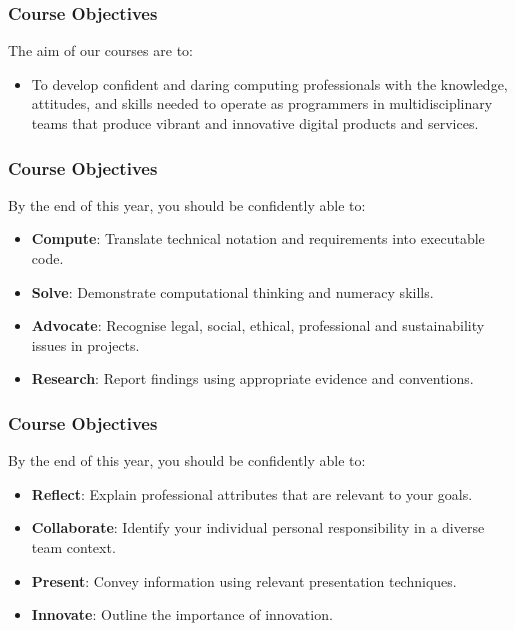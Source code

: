 %	
%	

\begin{frame}
	\frametitle{Course Objectives}
	
	The aim of our courses are to:
	
	\vspace{2em}
	
	\begin{itemize}
		\item To develop confident and daring computing professionals with the knowledge, attitudes, and skills needed to operate as programmers in multidisciplinary teams that produce vibrant and innovative digital products and services.
	\end{itemize}
\end{frame}

\begin{frame}
	\frametitle{Course Objectives}
	
	By the end of this year, you should be confidently able to: 
	
	\begin{itemize}
		\item \textbf{Compute}: Translate technical notation and requirements into executable code. 
		\item \textbf{Solve}: Demonstrate computational thinking and numeracy skills.
		\item \textbf{Advocate}: Recognise legal, social, ethical, professional and sustainability issues in projects.
		\item \textbf{Research}: Report findings using appropriate evidence and conventions.
	\end{itemize}
\end{frame}

\begin{frame}
	\frametitle{Course Objectives}
	
	By the end of this year, you should be confidently able to:
	
	\begin{itemize}
		\item \textbf{Reflect}: Explain professional attributes that are relevant to your goals.
		\item \textbf{Collaborate}: Identify your individual personal responsibility in a diverse team context.
		\item \textbf{Present}: Convey information using relevant presentation techniques.
		\item \textbf{Innovate}: Outline the importance of innovation.
	\end{itemize}
\end{frame}

